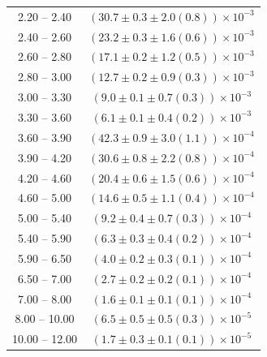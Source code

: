 \begin{table}
\begin{center}
\begin{tabular}{ c | c }
2.20 -- 2.40 & $(30.7\pm0.3\pm2.0(0.8))\times10^{-3}$ \\ 
2.40 -- 2.60 & $(23.2\pm0.3\pm1.6(0.6))\times10^{-3}$ \\ 
2.60 -- 2.80 & $(17.1\pm0.2\pm1.2(0.5))\times10^{-3}$ \\ 
2.80 -- 3.00 & $(12.7\pm0.2\pm0.9(0.3))\times10^{-3}$ \\ 
3.00 -- 3.30 & $(9.0\pm0.1\pm0.7(0.3))\times10^{-3}$ \\ 
3.30 -- 3.60 & $(6.1\pm0.1\pm0.4(0.2))\times10^{-3}$ \\ 
3.60 -- 3.90 & $(42.3\pm0.9\pm3.0(1.1))\times10^{-4}$ \\ 
3.90 -- 4.20 & $(30.6\pm0.8\pm2.2(0.8))\times10^{-4}$ \\ 
4.20 -- 4.60 & $(20.4\pm0.6\pm1.5(0.6))\times10^{-4}$ \\ 
4.60 -- 5.00 & $(14.6\pm0.5\pm1.1(0.4))\times10^{-4}$ \\ 
5.00 -- 5.40 & $(9.2\pm0.4\pm0.7(0.3))\times10^{-4}$ \\ 
5.40 -- 5.90 & $(6.3\pm0.3\pm0.4(0.2))\times10^{-4}$ \\ 
5.90 -- 6.50 & $(4.0\pm0.2\pm0.3(0.1))\times10^{-4}$ \\ 
6.50 -- 7.00 & $(2.7\pm0.2\pm0.2(0.1))\times10^{-4}$ \\ 
7.00 -- 8.00 & $(1.6\pm0.1\pm0.1(0.1))\times10^{-4}$ \\ 
8.00 -- 10.00 & $(6.5\pm0.5\pm0.5(0.3))\times10^{-5}$ \\ 
10.00 -- 12.00 & $(1.7\pm0.3\pm0.1(0.1))\times10^{-5}$ \\ 
\hline
\end{tabular}
\end{center}
\end{table}
 

